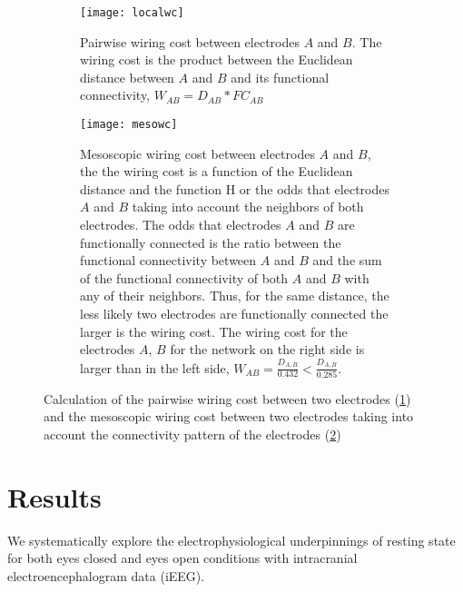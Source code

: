 \documentclass[11pt, onecolumn]{article}
\begin{document}
\begin{figure}[ht] 
  \begin{subfigure}[t]{0.5\linewidth}
    \centering
    \texttt{[image: localwc]} 
    \caption{Pairwise wiring cost between electrodes $A$ and $B$. The wiring cost is the product between the Euclidean distance between $A$ and $B$ and its functional connectivity, $W_{AB} = D_{AB} * FC_{AB}$} 
    \label{fig:wca} 
    \vspace{4ex}
  \end{subfigure}%
  \hspace{1ex}
  \begin{subfigure}[t]{0.5\linewidth}
    \centering
    \texttt{[image: mesowc]} 
    \caption{Mesoscopic wiring cost between electrodes $A$ and $B$, the the wiring cost is a function of the Euclidean distance and the function H or the odds that electrodes $A$ and $B$ taking into account the neighbors of both electrodes. The odds that electrodes $A$ and $B$ are functionally connected is the ratio between the functional connectivity between $A$ and $B$ and the sum of the functional connectivity of both $A$ and $B$ with any of their neighbors. Thus, for the same distance, the less likely two electrodes are functionally connected the larger is the wiring cost. The wiring cost for the electrodes $A$, $B$ for the network on the right side is larger than in the left side, $W_{AB} = \frac{D_{A,B}}{0.432} < \frac{D_{A,B}}{0.285}$.} 
    \label{fig:wcb} 
    \vspace{4ex}
  \end{subfigure} 
  \caption{Calculation of the pairwise wiring cost between two electrodes (\ref{fig:wca}) and the mesoscopic wiring cost between two electrodes taking into account the connectivity pattern of the electrodes (\ref{fig:wcb})}
  \label{fig:wc} 
\end{figure}

\section{Results}
We systematically explore the electrophysiological underpinnings of resting state for both eyes closed and eyes open conditions with intracranial electroencephalogram data (iEEG).
\end{document}
